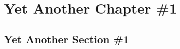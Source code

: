 \chapter{Yet Another Chapter \#1}
\label{chapter:YAP1}


\section{Yet Another Section \#1}
\label{sec:YAP1_YAS1}
